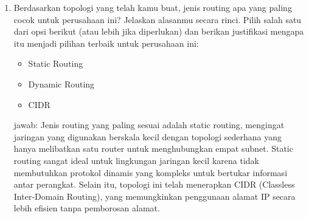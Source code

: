 \begin{enumerate}
\item Berdasarkan topologi yang telah kamu buat, jenis routing apa yang paling cocok untuk perusahaan ini? Jelaskan alasanmu secara rinci. Pilih salah satu dari opsi berikut (atau lebih jika diperlukan) dan berikan justifikasi mengapa itu menjadi pilihan terbaik untuk perusahaan ini:
\begin{itemize}
        \item Static Routing
        \item Dynamic Routing
        \item CIDR
    \end{itemize}

    jawab:
    Jenis routing yang paling sesuai adalah static routing, mengingat jaringan yang digunakan berskala kecil dengan topologi sederhana yang hanya melibatkan satu router untuk menghubungkan empat subnet. Static routing sangat ideal untuk lingkungan jaringan kecil karena tidak membutuhkan protokol dinamis yang kompleks untuk bertukar informasi antar perangkat. Selain itu, topologi ini telah menerapkan CIDR (Classless Inter-Domain Routing), yang memungkinkan penggunaan alamat IP secara lebih efisien tanpa pemborosan alamat.


\end{enumerate}